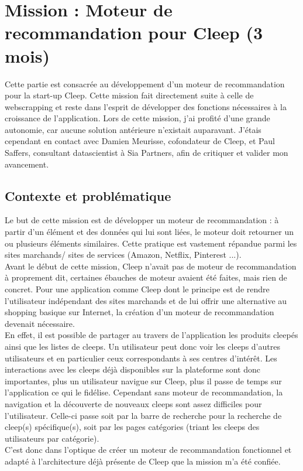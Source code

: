 \documentclass{article} %
\begin{document}
\newpage

\section{Mission : Moteur de recommandation pour Cleep (3 mois)}

Cette partie est consacrée au développement d'un moteur de recommandation pour la start-up Cleep. Cette mission fait directement suite à celle de webscrapping et reste dans l'esprit de développer des fonctions nécessaires à la croissance de l'application. Lors de cette mission, j'ai profité d'une grande autonomie, car aucune solution antérieure n'existait auparavant. J'étais cependant en contact avec Damien Meurisse, cofondateur de Cleep, et Paul Saffers, consultant datascientist à Sia Partners, afin de critiquer et valider mon avancement. 

\subsection{Contexte et problématique}

Le but de cette mission est de développer un moteur de recommandation : à partir d'un élément et des données qui lui sont liées, le moteur doit retourner un ou plusieurs éléments similaires. Cette pratique est vastement répandue parmi les sites marchands/ sites de services (Amazon, Netflix, Pinterest ...).\\

Avant le début de cette mission, Cleep n'avait pas de moteur de recommandation à proprement dit, certaines ébauches de moteur avaient été faites, mais rien de concret. Pour une application comme Cleep dont le principe est de rendre l'utilisateur indépendant des sites marchands et de lui offrir une alternative au shopping basique sur Internet, la création d'un moteur de recommandation devenait nécessaire.\\
En effet, il est possible de partager au travers de l'application les produits cleepés ainsi que les listes de cleeps. Un utilisateur peut donc voir les cleeps d'autres utilisateurs et en particulier ceux correspondants à ses centres d'intérêt. Les interactions avec les cleeps déjà disponibles sur la plateforme sont donc importantes, plus un utilisateur navigue sur Cleep, plus il passe de temps sur l'application ce qui le fidélise. Cependant sans moteur de recommandation, la navigation et la découverte de nouveaux cleeps sont assez difficiles pour l'utilisateur. Celle-ci passe soit par la barre de recherche pour la recherche de cleep(s) spécifique(s), soit par les pages catégories (triant les cleeps des utilisateurs par catégorie).\\
C'est donc dans l'optique de créer un moteur de recommandation fonctionnel et adapté à l'architecture déjà présente de Cleep que la mission m'a été confiée.
\end{document}
